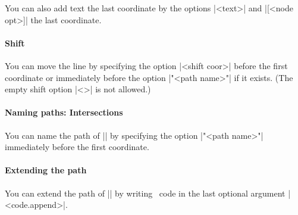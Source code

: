 You can also add text  the last coordinate by the options |{<text>}| and |[<node opt>]|  the last coordinate.

\begin{tzcode}{.3}
\end{tzcode}

\paragraph{Shift}
You can move the line by specifying the option |<shift coor>| before the first coordinate or immediately before the option |"<path name>"| if it exists.
(The empty shift option |<>| is not allowed.)

\begin{tzcode}{.3}
\end{tzcode}

\paragraph{Naming paths: Intersections}
You can name the path of |\tzto| by specifying the option |"<path name>"| immediately before the first coordinate.

\begin{tzcode}{.3}
\end{tzcode}

\paragraph{Extending the path}
You can extend the path of |\tzto| by writing \Tikz\ code in the last optional argument |<code.append>|.

